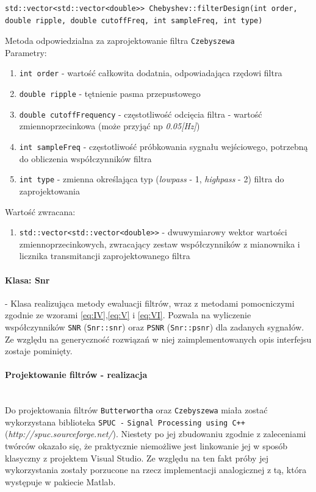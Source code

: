 \documentclass[a4paper, 11pt]{article}
\begin{document}
\begin{lstlisting}
std::vector<std::vector<double>> Chebyshev::filterDesign(int order, 
double ripple, double cutoffFreq, int sampleFreq, int type)
\end{lstlisting}
Metoda odpowiedzialna za zaprojektowanie filtra \verb|Czebyszewa|\\

Parametry:
\begin{enumerate}
\item \verb|int order| - wartość całkowita dodatnia, odpowiadająca rzędowi filtra
\item \verb|double ripple| - tętnienie pasma przepustowego 
\item \verb|double cutoffFrequency| - częstotliwość odcięcia filtra - wartość zmiennoprzecinkowa (może przyjąć np \textit{0.05[Hz]})
\item \verb|int sampleFreq| - częstotliwość próbkowania sygnału wejściowego, potrzebną do obliczenia współczynników filtra
\item \verb|int type| - zmienna określająca typ (\textit{lowpass} - 1, \textit{highpass} - 2) filtra do zaprojektowania
\end{enumerate}
Wartość zwracana:
\begin{enumerate}
\item \verb|std::vector<std::vector<double>>| - dwuwymiarowy wektor wartości zmiennoprzecinkowych, zwracający zestaw współczynników z mianownika i licznika transmitancji zaprojektowanego filtra
\end{enumerate}

\paragraph{Klasa: Snr}
- Klasa realizująca metody ewaluacji filtrów, wraz z metodami pomocniczymi zgodnie ze wzorami \eqref{eq:IV},\eqref{eq:V} i \eqref{eq:VI}. Pozwala na wyliczenie współczynników \verb|SNR| (\verb|Snr::snr|) oraz \verb|PSNR| (\verb|Snr::psnr|) dla zadanych sygnałów. Ze względu na generyczność rozwiązań w niej zaimplementowanych opis interfejsu zostaje pominięty.

\paragraph{Projektowanie filtrów - realizacja}\mbox{} \\
Do projektowania filtrów \verb|Butterwortha| oraz \verb|Czebyszewa| miała zostać wykorzystana biblioteka \verb|SPUC -| \verb|Signal Processing using C++| (\textit{http://spuc.sourceforge.net/}). Niestety po jej zbudowaniu zgodnie z zaleceniami twórców okazało się, że praktycznie niemożliwe jest linkowanie jej w sposób klasyczny z projektem Visual Studio. Ze względu na ten fakt próby jej wykorzystania zostały porzucone na rzecz implementacji analogicznej z tą, która występuje w pakiecie Matlab.
\end{document}
